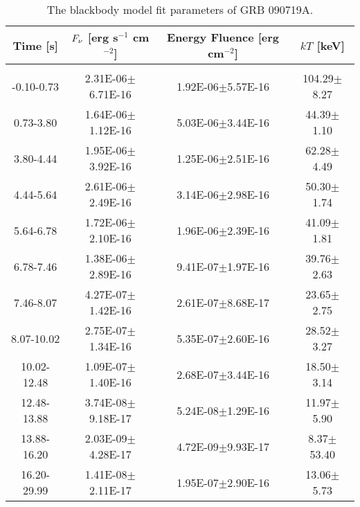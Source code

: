 \begin{table}[h]
\centering
\scriptsize
\label{tab:}
\begin{tabular}{c| c c c}
Time [s] & $F_{\nu}$ [erg s$^{-1}$ cm$^{-2}$] & Energy Fluence [erg cm$^{-2}$] & $kT$ [keV] \\
\hline \hline\\ 

-0.10-0.73 & 2.31E-06$\pm$6.71E-16 & 1.92E-06$\pm$5.57E-16 & 104.29$\pm$8.27 \\ 

0.73-3.80 & 1.64E-06$\pm$1.12E-16 & 5.03E-06$\pm$3.44E-16 & 44.39$\pm$1.10 \\ 

3.80-4.44 & 1.95E-06$\pm$3.92E-16 & 1.25E-06$\pm$2.51E-16 & 62.28$\pm$4.49 \\ 

4.44-5.64 & 2.61E-06$\pm$2.49E-16 & 3.14E-06$\pm$2.98E-16 & 50.30$\pm$1.74 \\ 

5.64-6.78 & 1.72E-06$\pm$2.10E-16 & 1.96E-06$\pm$2.39E-16 & 41.09$\pm$1.81 \\ 

6.78-7.46 & 1.38E-06$\pm$2.89E-16 & 9.41E-07$\pm$1.97E-16 & 39.76$\pm$2.63 \\ 

7.46-8.07 & 4.27E-07$\pm$1.42E-16 & 2.61E-07$\pm$8.68E-17 & 23.65$\pm$2.75 \\ 

8.07-10.02 & 2.75E-07$\pm$1.34E-16 & 5.35E-07$\pm$2.60E-16 & 28.52$\pm$3.27 \\ 

10.02-12.48 & 1.09E-07$\pm$1.40E-16 & 2.68E-07$\pm$3.44E-16 & 18.50$\pm$3.14 \\ 

12.48-13.88 & 3.74E-08$\pm$9.18E-17 & 5.24E-08$\pm$1.29E-16 & 11.97$\pm$5.90 \\ 

13.88-16.20 & 2.03E-09$\pm$4.28E-17 & 4.72E-09$\pm$9.93E-17 & 8.37$\pm$53.40 \\ 

16.20-29.99 & 1.41E-08$\pm$2.11E-17 & 1.95E-07$\pm$2.90E-16 & 13.06$\pm$5.73 \\ 

\end{tabular}
\caption{The blackbody model fit parameters of GRB 090719A.}
\end{table}

